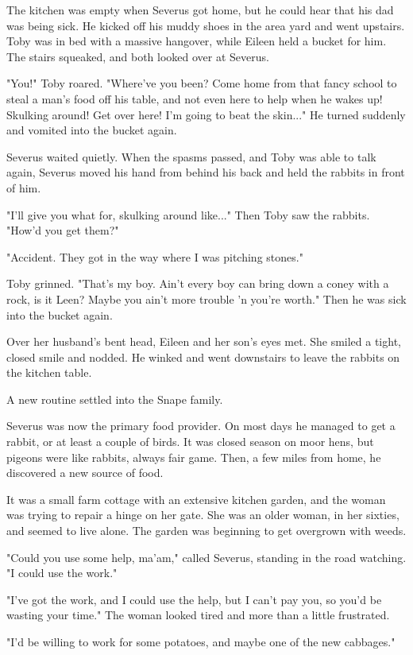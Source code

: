 \documentclass[a4paper,11pt]{article}
\begin{document}
The kitchen was empty when Severus got home, but he could hear that his dad was being sick. He kicked off his muddy shoes in the area yard and went upstairs. Toby was in bed with a massive hangover, while Eileen held a bucket for him. The stairs squeaked, and both looked over at Severus.

"You!" Toby roared. "Where've you been? Come home from that fancy school to steal a man's food off his table, and not even here to help when he wakes up! Skulking around! Get over here! I'm going to beat the skin..." He turned suddenly and vomited into the bucket again.

Severus waited quietly. When the spasms passed, and Toby was able to talk again, Severus moved his hand from behind his back and held the rabbits in front of him.

"I'll give you what for, skulking around like..." Then Toby saw the rabbits. "How'd you get them?"

"Accident. They got in the way where I was pitching stones."

Toby grinned. "That's my boy. Ain't every boy can bring down a coney with a rock, is it Leen? Maybe you ain't more trouble 'n you're worth." Then he was sick into the bucket again.

Over her husband's bent head, Eileen and her son's eyes met. She smiled a tight, closed smile and nodded. He winked and went downstairs to leave the rabbits on the kitchen table.

A new routine settled into the Snape family.

Severus was now the primary food provider. On most days he managed to get a rabbit, or at least a couple of birds. It was closed season on moor hens, but pigeons were like rabbits, always fair game. Then, a few miles from home, he discovered a new source of food.

It was a small farm cottage with an extensive kitchen garden, and the woman was trying to repair a hinge on her gate. She was an older woman, in her sixties, and seemed to live alone. The garden was beginning to get overgrown with weeds.

"Could you use some help, ma'am," called Severus, standing in the road watching. "I could use the work."

"I've got the work, and I could use the help, but I can't pay you, so you'd be wasting your time." The woman looked tired and more than a little frustrated.

"I'd be willing to work for some potatoes, and maybe one of the new cabbages."
\end{document}
